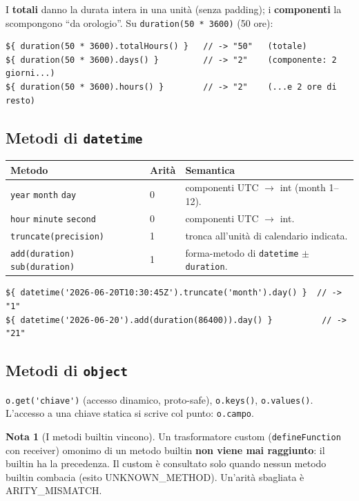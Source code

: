 \documentclass[11pt,a4paper]{book}
\let\code\lstinline
\newcommand{\ic}[1]{{\ttfamily #1}}
\theoremstyle{definition}
\newtheorem*{nota}{Nota}
\begin{document}
{{{{I \textbf{totali} danno la durata intera in una unità (senza padding); i
\textbf{componenti} la scompongono ``da orologio''. Su \code|duration(50 * 3600)|
(50 ore):

\begin{lstlisting}
${ duration(50 * 3600).totalHours() }   // -> "50"   (totale)
${ duration(50 * 3600).days() }         // -> "2"    (componente: 2 giorni...)
${ duration(50 * 3600).hours() }        // -> "2"    (...e 2 ore di resto)
\end{lstlisting}

\subsection{Metodi di \texttt{datetime}}

\begin{center}
\small
\begin{tabular}{@{}l l p{7.4cm}@{}}
\toprule
\textbf{Metodo} & \textbf{Arità} & \textbf{Semantica} \\
\midrule
\code|year| \code|month| \code|day| & 0 & componenti UTC $\rightarrow$ \ic{int}
(\ic{month} 1--12). \\
\code|hour| \code|minute| \code|second| & 0 & componenti UTC $\rightarrow$ \ic{int}. \\
\code|truncate(precision)| & 1 & tronca all'unità di calendario indicata. \\
\code|add(duration)| \code|sub(duration)| & 1 & forma-metodo di
\code|datetime| $\pm$ \code|duration|. \\
\bottomrule
\end{tabular}
\end{center}

\begin{lstlisting}
${ datetime('2026-06-20T10:30:45Z').truncate('month').day() }  // -> "1"
${ datetime('2026-06-20').add(duration(86400)).day() }          // -> "21"
\end{lstlisting}

\subsection{Metodi di \texttt{object}}

\code|o.get('chiave')| (accesso dinamico, proto-safe), \code|o.keys()|,
\code|o.values()|. L'accesso a una chiave statica si scrive col punto:
\code|o.campo|.

\begin{nota}[I metodi builtin vincono]
Un trasformatore custom (\code|defineFunction| con \ic{receiver}) omonimo di un
metodo builtin \textbf{non viene mai raggiunto}: il builtin ha la precedenza. Il
custom è consultato solo quando nessun metodo builtin combacia (esito
\ic{UNKNOWN\_METHOD}). Un'arità sbagliata è \ic{ARITY\_MISMATCH}.
\end{nota}

}}}}
\end{document}
